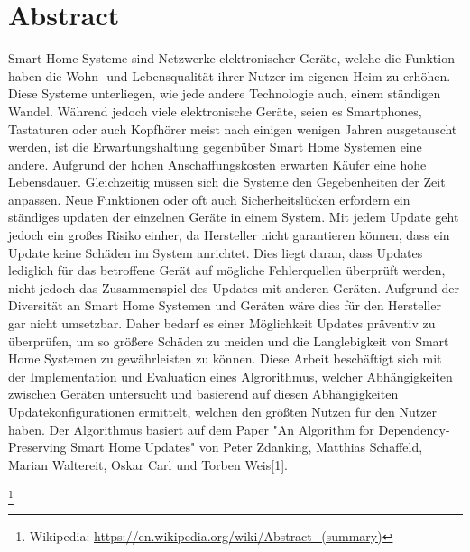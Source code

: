 \chapter*{Abstract}


Smart Home Systeme sind Netzwerke elektronischer Geräte, welche die Funktion haben die Wohn- und Lebensqualität
ihrer Nutzer im eigenen Heim zu erhöhen.
Diese Systeme unterliegen, wie jede andere Technologie auch, einem ständigen Wandel. Während jedoch viele elektronische 
Geräte, seien es Smartphones, Tastaturen oder auch Kopfhörer meist nach einigen wenigen Jahren ausgetauscht werden, ist die 
Erwartungshaltung gegenbüber Smart Home Systemen eine andere. Aufgrund der hohen Anschaffungskosten erwarten Käufer
eine hohe Lebensdauer. Gleichzeitig müssen sich die Systeme den Gegebenheiten der Zeit anpassen. Neue Funktionen oder oft
auch Sicherheitslücken erfordern ein ständiges updaten der einzelnen Geräte in einem System. Mit jedem Update geht jedoch ein großes Risiko 
einher, da Hersteller nicht garantieren können, dass ein Update keine Schäden im System anrichtet. Dies liegt daran, 
dass Updates lediglich für das betroffene Gerät auf 
mögliche Fehlerquellen überprüft werden, nicht jedoch das Zusammenspiel des Updates mit anderen Geräten. 
Aufgrund der Diversität an Smart Home Systemen und Geräten wäre dies für den Hersteller gar nicht umsetzbar.
Daher bedarf es einer Möglichkeit Updates präventiv zu überprüfen, um so größere Schäden zu meiden und 
die Langlebigkeit von Smart Home Systemen zu gewährleisten zu können.
Diese Arbeit beschäftigt sich mit der Implementation und Evaluation eines Algrorithmus, welcher 
Abhängigkeiten zwischen Geräten untersucht und basierend auf diesen Abhängigkeiten Updatekonfigurationen 
ermittelt, welchen den größten Nutzen für den Nutzer haben.
Der Algorithmus basiert auf dem Paper "An Algorithm for Dependency-Preserving 
Smart Home Updates" von Peter Zdanking, Matthias Schaffeld, Marian Waltereit, Oskar Carl und Torben Weis[1]. 






\footnote{Wikipedia: \url{https://en.wikipedia.org/wiki/Abstract_(summary)}}


